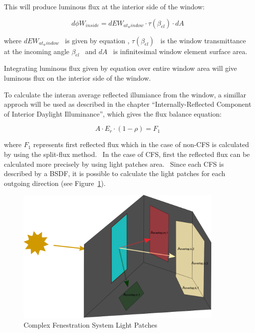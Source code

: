 This will produce luminous flux at the interior side of the window:

\begin{equation}
d\phi {W_{inside}} = dE{W_{at_window}} \cdot \tau ({\beta_{el}}) \cdot dA
\end{equation}

where \(dE{W_{at_window}}\) ~is given by equation , \(\tau ({\beta_{el}})\) ~is the window transmittance at the incoming angle \({\beta_{el}}\) ~and \(dA\) ~is infinitesimal window element surface area.

Integrating luminous flux given by equation over entire window area will give luminous flux on the interior side of the window.

To calculate the interan average reflected illumiance from the window, a simillar approch will be used as described in the chapter ``Internally-Reflected Component of Interior Daylight Illuminance'', which gives the flux balance equation:

\begin{equation}
A \cdot {E_r} \cdot (1 - \rho ) = {F_1}
\end{equation}

where \({F_1}\) represents first reflected flux which in the case of non-CFS is calculated by using the split-flux method.~ In the case of CFS, first the reflected flux can be calculated more precisely by using light patches area.~ Since each CFS is described by a BSDF, it is possible to calculate the light patches for each outgoing direction (see Figure~\ref{fig:complex-fenestration-system-light-patches}).

\begin{figure}[hbtp] %
\centering
\includegraphics[width=0.9\textwidth, height=0.9\textheight, keepaspectratio=true]{media/image842.png}
\caption{Complex Fenestration System Light Patches \protect \label{fig:complex-fenestration-system-light-patches}}
\end{figure}

